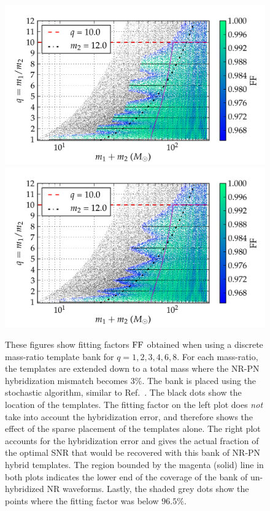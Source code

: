 \begin{figure}
\begin{center}
\includegraphics[width=\columnwidth]{bank001_lowM_01_stochastic_mtot200_logMq_NOhybMM.png}
\includegraphics[width=\columnwidth]{bank001_lowM_01_stochastic_mtot200_logMq_hybMM.png}
\caption{\label{fig:Current-hybrids-stochastic-FF}These figures show fitting
  factors $\mathrm{FF}$ obtained when using a discrete mass-ratio template bank for
  $q=1,2,3,4,6,8$. For each mass-ratio, the templates are extended down 
  to a total mass where the NR-PN hybridization mismatch becomes
  $3\%$. The bank is placed using the stochastic algorithm, similar to 
  Ref.~\cite{Harry:2009ea,Ajith:2012mn,Manca:2009xw}. 
  The black dots show the location
  of the templates. The fitting factor on the left plot does 
  {\em not} take into account the hybridization error, and therefore shows the
  effect of the sparse placement of the templates alone. 
  The right plot accounts for the hybridization error
  and gives the actual fraction of the optimal SNR that would be recovered
  with this bank of NR-PN hybrid templates. The region bounded by the magenta 
  (solid) line in both plots indicates the lower end of the coverage of the 
  bank of un-hybridized NR waveforms. Lastly, the shaded grey dots show the 
  points where the fitting factor was below $96.5\%$.}
\end{center}
\end{figure}
